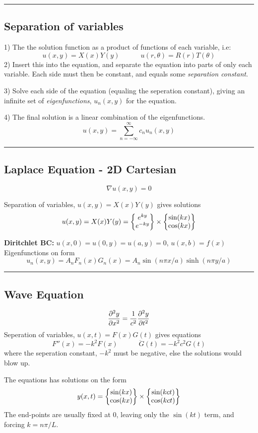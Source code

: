 \documentclass[10pt,a4paper]{article}
\renewcommand{\exp}{e^}
\newcommand{\holine}{\rule{286pt}{1pt}}
\begin{document}
\begin{multicols}{2}
\holine
\subsection*{Separation of variables}
1) The the solution function as a product of functions of each variable, i.e:
\[
    u(x,y) = X(x)Y(y) \quad\quad\quad u(r, \theta) = R(r)T(\theta)
\]
2) Insert this into the equation, and separate the equation into parts of only each variable. Each side must then be constant, and equals some \textit{separation constant}.

3) Solve each side of the equation (equaling the seperation constant), giving an infinite set of \textit{eigenfunctions}, $u_n(x,y)$ for the equation.

4) The final solution is a linear combination of the eigenfunctions.
\[
u(x,y) = \sum_{n=-\infty}^\infty c_n u_n(x,y)
\]



\holine
\subsection*{Laplace Equation - 2D Cartesian}
\[
    \nabla u(x,y) = 0
\]

Separation of variables, $u(x,y) = X(x)Y(y)$ gives solutions
\[
    u(x,y) = X(x)Y(y) = \qty{\begin{matrix} \exp{ky} \\ \exp{-ky} \end{matrix}} \times \qty{\begin{matrix} \sin(kx) \\ \cos(kx) \end{matrix}}
\]

\textbf{Diritchlet BC:} $u(x,0) = u(0,y) = u(a,y) = 0$, $u(x,b) = f(x)$
Eigenfunctions on form
\[
    u_n(x,y) = A_nF_n(x)G_n(x) = A_n\sin(n\pi x/a)\sinh(n\pi y/a)
\]


\holine
\subsection*{Wave Equation}
\[
    \pdv[2]{y}{x} = \frac{1}{c^2}\pdv[2]{y}{t}
\]
Seperation of variables, $u(x,t) = F(x)G(t)$ gives equations
\[
    F''(x) = -k^2F(x) \quad\quad\quad \ddot{G}(t) = -k^2c^2G(t)
\]
where the seperation constant, $-k^2$ must be negative, else the solutions would blow up.

The equations has solutions on the form
\[
    y(x,t) = \qty{\begin{matrix} \sin(kx) \\ \cos(kx) \end{matrix}} \times \qty{\begin{matrix} \sin(kct) \\ \cos(kct) \end{matrix}}
\]
The end-points are usually fixed at 0, leaving only the $\sin(kt)$ term, and forcing $k=n\pi/L$.


\end{multicols}
\end{document}
